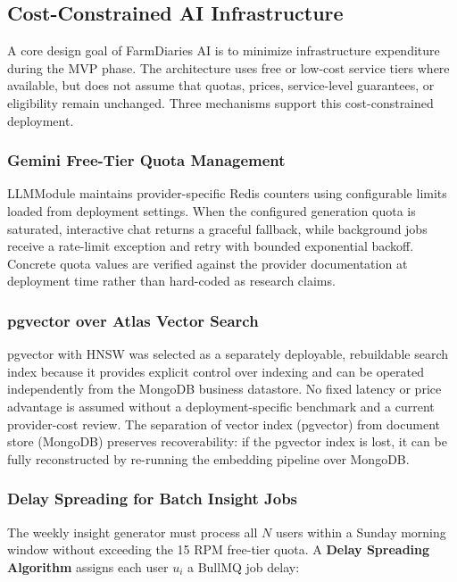 \documentclass[conference]{IEEEtran}
\begin{document}
\subsection{Cost-Constrained AI Infrastructure}

A core design goal of FarmDiaries AI is to minimize infrastructure expenditure during the MVP phase. The architecture uses free or low-cost service tiers where available, but does not assume that quotas, prices, service-level guarantees, or eligibility remain unchanged. Three mechanisms support this cost-constrained deployment.

\subsubsection{Gemini Free-Tier Quota Management}

LLMModule maintains provider-specific Redis counters using configurable limits loaded from deployment settings. When the configured generation quota is saturated, interactive chat returns a graceful fallback, while background jobs receive a rate-limit exception and retry with bounded exponential backoff. Concrete quota values are verified against the provider documentation at deployment time rather than hard-coded as research claims.

\subsubsection{pgvector over Atlas Vector Search}

pgvector with HNSW was selected as a separately deployable, rebuildable search index because it provides explicit control over indexing and can be operated independently from the MongoDB business datastore. No fixed latency or price advantage is assumed without a deployment-specific benchmark and a current provider-cost review. The separation of vector index (pgvector) from document store (MongoDB) preserves recoverability: if the
pgvector index is lost, it can be fully reconstructed by
re-running the embedding pipeline over MongoDB.

\subsubsection{Delay Spreading for Batch Insight Jobs}

The weekly insight generator must process all $N$ users within a
Sunday morning window without exceeding the 15 RPM free-tier quota.
A \textbf{Delay Spreading Algorithm} assigns each user $u_i$ a
BullMQ job delay:
\end{document}
